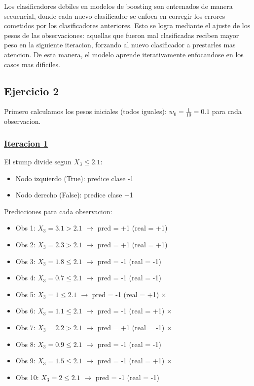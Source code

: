 \documentclass[12pt]{article}
\begin{document}
Los clasificadores debiles en modelos de boosting son entrenados de manera secuencial, donde cada nuevo clasificador se enfoca en corregir los errores cometidos por los clasificadores anteriores. Esto se logra mediante el ajuste de los pesos de las observaciones: aquellas que fueron mal clasificadas reciben mayor peso en la siguiente iteracion, forzando al nuevo clasificador a prestarles mas atencion. De esta manera, el modelo aprende iterativamente enfocandose en los casos mas dificiles.

\subsection{Ejercicio 2}

Primero calculamos los pesos iniciales (todos iguales): $w_0 = \frac{1}{10} = 0.1$ para cada observacion.

\subsubsection*{\underline{Iteracion 1}}

El stump divide segun $X_3 \leq 2.1$:
\begin{itemize}
    \item Nodo izquierdo (True): predice clase -1
    \item Nodo derecho (False): predice clase +1
\end{itemize}

Predicciones para cada observacion:
\begin{itemize}
    \item Obs 1: $X_3 = 3.1 > 2.1$ $\rightarrow$ pred = +1 (real = +1) \checkmark
    \item Obs 2: $X_3 = 2.3 > 2.1$ $\rightarrow$ pred = +1 (real = +1) \checkmark
    \item Obs 3: $X_3 = 1.8 \leq 2.1$ $\rightarrow$ pred = -1 (real = -1) \checkmark
    \item Obs 4: $X_3 = 0.7 \leq 2.1$ $\rightarrow$ pred = -1 (real = -1) \checkmark
    \item Obs 5: $X_3 = 1 \leq 2.1$ $\rightarrow$ pred = -1 (real = +1) $\times$
    \item Obs 6: $X_3 = 1.1 \leq 2.1$ $\rightarrow$ pred = -1 (real = +1) $\times$
    \item Obs 7: $X_3 = 2.2 > 2.1$ $\rightarrow$ pred = +1 (real = -1) $\times$
    \item Obs 8: $X_3 = 0.9 \leq 2.1$ $\rightarrow$ pred = -1 (real = -1) \checkmark
    \item Obs 9: $X_3 = 1.5 \leq 2.1$ $\rightarrow$ pred = -1 (real = +1) $\times$
    \item Obs 10: $X_3 = 2 \leq 2.1$ $\rightarrow$ pred = -1 (real = -1) \checkmark
\end{itemize}
\end{document}
